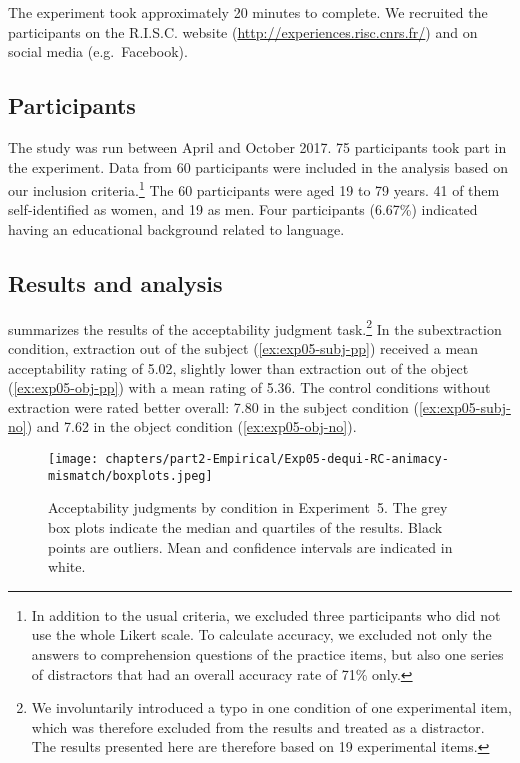 The experiment took approximately 20 minutes to complete. We recruited the participants on the R.I.S.C. website (\url{http://experiences.risc.cnrs.fr/}) and on social media (e.g.\ Facebook).

\subsection{Participants}

The study was run between April and October 2017.  
75 participants took part in the experiment. Data from 60 participants were included in the analysis based on our inclusion criteria.\footnote{In addition to the usual criteria, we excluded three participants who did not use the whole Likert scale. To calculate accuracy, we excluded not only the answers to comprehension questions of the practice items, but also one series of distractors that had an overall accuracy rate of 71\% only.}
The 60 participants were aged 19 to 79 years. 41 of them self-identified as women, and 19 as men. Four participants (6.67\%) indicated having an educational background related to language.

\subsection{Results and analysis}



 summarizes the results of the acceptability judgment task.\footnote{We involuntarily introduced a typo in one condition of one experimental item, which was therefore excluded from the results and treated as a distractor. The results presented here are therefore based on 19 experimental items.}
In the subextraction condition, extraction out of the subject (\ref{ex:exp05-subj-pp}) received a mean acceptability rating of 5.02, slightly lower than extraction out of the object (\ref{ex:exp05-obj-pp}) with a mean rating of 5.36. The control conditions without extraction were rated better overall: 7.80 in the subject condition (\ref{ex:exp05-subj-no}) and 7.62 in the object condition (\ref{ex:exp05-obj-no}). 

\begin{figure}
    \centering
    \texttt{[image: chapters/part2-Empirical/Exp05-dequi-RC-animacy-mismatch/boxplots.jpeg]}
    \caption{Acceptability judgments by condition in Experiment~5. The grey box plots indicate the median and quartiles of the results. Black points are outliers. Mean and confidence intervals are indicated in white.}
    \label{fig:exp05-boxplot}
\end{figure}


